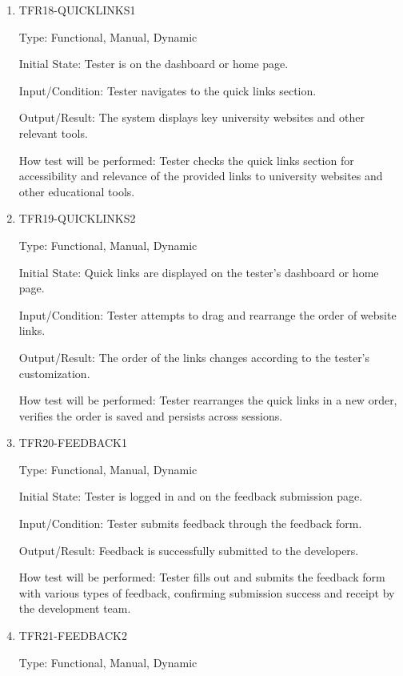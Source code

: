 \documentclass[12pt, titlepage]{article}
\begin{document}
\begin{enumerate}
\item{TFR18-QUICKLINKS1\\}\label{TFR18-QUICKLINKS1}

Type: Functional, Manual, Dynamic

Initial State: Tester is on the dashboard or home page.

Input/Condition: Tester navigates to the quick links section.

Output/Result: The system displays key university websites and other relevant tools.

How test will be performed: Tester checks the quick links section for accessibility and relevance of the provided links to university websites and other educational tools.


\item{TFR19-QUICKLINKS2\\}\label{TFR19-QUICKLINKS2}

Type: Functional, Manual, Dynamic

Initial State: Quick links are displayed on the tester's dashboard or home page.

Input/Condition: Tester attempts to drag and rearrange the order of website links.

Output/Result: The order of the links changes according to the tester's customization.

How test will be performed: Tester rearranges the quick links in a new order, verifies the order is saved and persists across sessions.

\item{TFR20-FEEDBACK1\\}\label{TFR20-FEEDBACK1}

Type: Functional, Manual, Dynamic

Initial State: Tester is logged in and on the feedback submission page.

Input/Condition: Tester submits feedback through the feedback form.

Output/Result: Feedback is successfully submitted to the developers.

How test will be performed: Tester fills out and submits the feedback form with various types of feedback, confirming submission success and receipt by the development team.


\item{TFR21-FEEDBACK2\\}\label{TFR21-FEEDBACK2}

Type: Functional, Manual, Dynamic


\end{enumerate}
\end{document}

